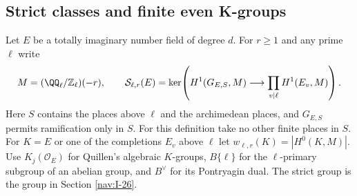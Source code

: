 \documentclass[a4paper,11pt]{article}
\theoremstyle{definition}
\theoremstyle{remark}
\newcommand{\ZZ}{\mathbb Z}\newcommand{\ord}{\operatorname{ord}}
\numberwithin{equation}{section}
\newcommand{\Sel}{\mathcal S}
\newcommand{\OO}{\mathcal O}
\begin{document}
\subsection{Strict classes and finite even K-groups}\label{nav:III-12}
\label{sec:wild98}

Let \(E\) be a totally imaginary number field of degree \(d\).
For \(r\ge1\) and any prime \(\ell\) write
\[
 M=(\QQ_\ell/\ZZ_\ell)(-r),\qquad
 \Sel_{\ell,r}(E)=
 \ker\!\left(H^1(G_{E,S},M)\longrightarrow
                      \prod_{v\mid\ell}H^1(E_v,M)\right).
\]
Here \(S\) contains the places above \(\ell\) and the archimedean
places, and \(G_{E,S}\) permits ramification only in \(S\).
For this definition take no other finite places in \(S\).
For \(K=E\) or one of the completions \(E_v\) above \(\ell\)
let \(w_{\ell,r}(K)=|H^0(K,M)|\).
Use \(K_j(\OO_E)\) for Quillen's algebraic \(K\)-groups,
\(B\{\ell\}\) for the \(\ell\)-primary subgroup of an abelian
group, and \(B^\vee\) for its Pontryagin dual. The strict group
is the group in Section \ref{nav:I-26}.
\end{document}
